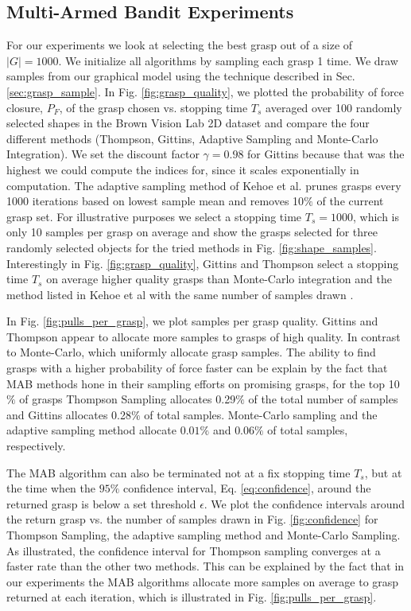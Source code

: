 \documentclass[a4paper, 10pt, conference]{ieeeconf}      %
\begin{document}
\subsection{Multi-Armed Bandit Experiments}
For our experiments we look at selecting the best grasp out of a size of $|G| = 1000$. We initialize all algorithms by sampling each grasp 1 time. We draw samples from our graphical model using the technique described in Sec.  \ref{sec:grasp_sample}. In Fig. \ref{fig:grasp_quality}, we plotted the probability of force closure, $P_F$, of the grasp chosen vs. stopping time $T_s$ averaged over 100 randomly selected shapes in the Brown Vision Lab 2D dataset and compare the four different methods (Thompson, Gittins, Adaptive Sampling \cite{kehoe2012toward} and Monte-Carlo Integration). We set the discount factor $\gamma =0.98$ for Gittins because that was the highest we could compute the indices for, since it scales exponentially in computation. The adaptive sampling method of Kehoe et al. prunes grasps every 1000 iterations based on lowest sample mean and removes 10$\%$ of the current grasp set.   For illustrative purposes we select a stopping time $T_s=1000$, which is only 10 samples per grasp on average and show the grasps selected for three randomly selected objects for the tried methods in Fig. \ref{fig:shape_samples}. Interestingly in Fig. \ref{fig:grasp_quality}, Gittins and Thompson select a stopping time $T_s$ on average higher quality grasps than Monte-Carlo integration and the method listed in Kehoe et al \cite{kehoe2012toward} with the same number of samples drawn .

 In Fig. \ref{fig:pulls_per_grasp}, we plot samples per grasp quality. Gittins and Thompson appear to allocate  more samples to grasps of high quality. In contrast to Monte-Carlo, which uniformly allocate grasp samples. The ability to find grasps with a higher probability of force  faster can be explain by the fact that MAB methods hone in their sampling efforts on promising grasps, for the top 10$\%$ of grasps Thompson Sampling allocates 0.29$\%$ of the total number of samples and Gittins allocates 0.28$\%$ of total samples. Monte-Carlo sampling and the adaptive sampling method allocate $0.01\%$  and $0.06\%$ of total samples, respectively. 
 
 
 The MAB algorithm can also be terminated not at a fix stopping time $T_s$, but at the time when the $95\%$ confidence interval, Eq. \ref{eq:confidence}, around the returned grasp is below a set threshold $\epsilon$. We plot the confidence intervals around the return grasp vs. the number of samples drawn in Fig. \ref{fig:confidence} for Thompson Sampling, the adaptive sampling method\cite{kehoe2012toward} and Monte-Carlo Sampling.  As illustrated, the confidence interval for Thompson sampling converges at a faster rate than the other two methods. This can be explained by the fact that in our experiments the MAB algorithms allocate more samples on average to grasp returned at each iteration, which is illustrated in Fig. \ref{fig:pulls_per_grasp}. 
\end{document}
